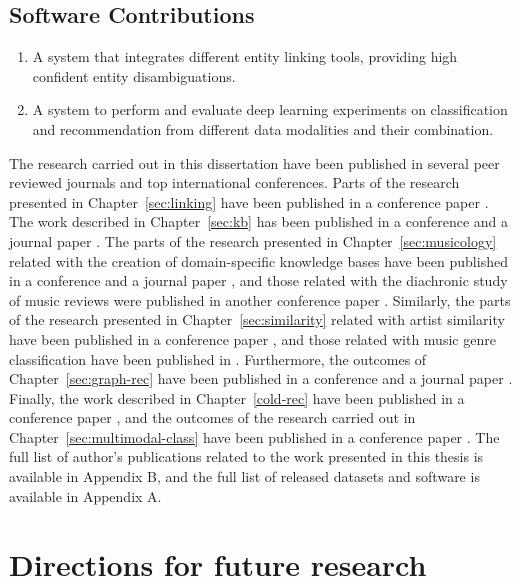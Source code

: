 \subsection{Software Contributions}

\begin{enumerate}
\item
A system that integrates different entity linking tools, providing high confident entity disambiguations.

\item
A system to perform and evaluate deep learning experiments on classification and recommendation from different data modalities and their combination. %

\end{enumerate}

The research carried out in this dissertation have been published in several peer reviewed journals and top international conferences. Parts of the research presented in Chapter~\ref{sec:linking} have been published in a conference paper \cite{Oramas2016}. The work described in Chapter~\ref{sec:kb} has been published in a conference and a journal paper \cite{Oramas2015,Oramas2016a}. The parts of the research presented in Chapter~\ref{sec:musicology} related with the creation of domain-specific knowledge bases have been published in a conference and a journal paper \cite{Oramas2015b,}, and those related with the diachronic study of music reviews were published in another conference paper \cite{oramas2016exploring}. Similarly, the parts of the research presented in Chapter~\ref{sec:similarity} related with artist similarity have been published in a conference paper \cite{Oramas2015a}, and those related with music genre classification have been published in \cite{oramas2016exploring}. Furthermore, the outcomes of Chapter~\ref{sec:graph-rec} have been published in a conference and a journal paper \cite{Ostuni2015,oramas2016sound}. Finally, the work described in Chapter~\ref{cold-rec} have been published in a conference paper \cite{}, and the outcomes of the research carried out in Chapter~\ref{sec:multimodal-class} have been published in a conference paper \cite{}. The full list of author's publications related to the work presented in this thesis is available in Appendix B, and the full list of released datasets and software is available in Appendix A.


\section{Directions for future research}
\label{sec:conclusion:future}

